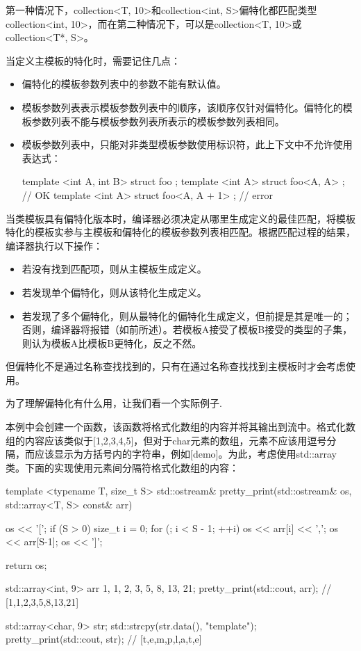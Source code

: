 第一种情况下，collection<T, 10>和collection<int, S>偏特化都匹配类型collection<int, 10>，而在第二种情况下，可以是collection<T, 10>或collection<T*, S>。

当定义主模板的特化时，需要记住几点：

\begin{itemize}
\item 
偏特化的模板参数列表中的参数不能有默认值。

\item 
模板参数列表表示模板参数列表中的顺序，该顺序仅针对偏特化。偏特化的模板参数列表不能与模板参数列表所表示的模板参数列表相同。

\item 
模板参数列表中，只能对非类型模板参数使用标识符，此上下文中不允许使用表达式：
\begin{cpp}
template <int A, int B> struct foo {};
template <int A> struct foo<A, A> {}; // OK
template <int A> struct foo<A, A + 1> {}; // error
\end{cpp}
\end{itemize}

当类模板具有偏特化版本时，编译器必须决定从哪里生成定义的最佳匹配，将模板特化的模板实参与主模板和偏特化的模板参数列表相匹配。根据匹配过程的结果，编译器执行以下操作：

\begin{itemize}
\item 
若没有找到匹配项，则从主模板生成定义。

\item 
若发现单个偏特化，则从该特化生成定义。

\item 
若发现了多个偏特化，则从最特化的偏特化生成定义，但前提是其是唯一的；否则，编译器将报错（如前所述）。若模板A接受了模板B接受的类型的子集，则认为模板A比模板B更特化，反之不然。
\end{itemize}

但偏特化不是通过名称查找找到的，只有在通过名称查找找到主模板时才会考虑使用。

为了理解偏特化有什么用，让我们看一个实际例子.

本例中会创建一个函数，该函数将格式化数组的内容并将其输出到流中。格式化数组的内容应该类似于[1,2,3,4,5]，但对于char元素的数组，元素不应该用逗号分隔，而应该显示为方括号内的字符串，例如[demo]。为此，考虑使用std::array类。下面的实现使用元素间分隔符格式化数组的内容：

\begin{cpp}
template <typename T, size_t S>
std::ostream& pretty_print(std::ostream& os,
                           std::array<T, S> const& arr)
{
	os << '[';
	if (S > 0)
	{
		size_t i = 0;
		for (; i < S - 1; ++i)
		os << arr[i] << ',';
		os << arr[S-1];
	}
	os << ']';
	
	return os;
}

std::array<int, 9> arr {1, 1, 2, 3, 5, 8, 13, 21};
pretty_print(std::cout, arr); // [1,1,2,3,5,8,13,21]

std::array<char, 9> str;
std::strcpy(str.data(), "template");
pretty_print(std::cout, str); // [t,e,m,p,l,a,t,e]
\end{cpp}

